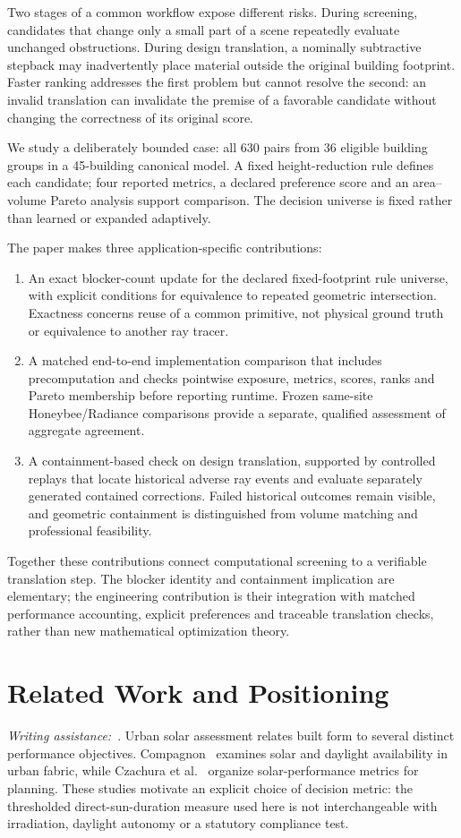 \documentclass{llncs}
\newcommand{\aidraft}{\textit{Writing assistance:}~\cite{openai2026}. }
\begin{document}
Two stages of a common workflow expose different risks. During screening, candidates that change only a small part of a scene repeatedly evaluate unchanged obstructions. During design translation, a nominally subtractive stepback may inadvertently place material outside the original building footprint. Faster ranking addresses the first problem but cannot resolve the second: an invalid translation can invalidate the premise of a favorable candidate without changing the correctness of its original score.

We study a deliberately bounded case: all 630 pairs from 36 eligible building groups in a 45-building canonical model. A fixed height-reduction rule defines each candidate; four reported metrics, a declared preference score and an area--volume Pareto analysis support comparison. The decision universe is fixed rather than learned or expanded adaptively. 

The paper makes three application-specific contributions:
\begin{enumerate}
\item An exact blocker-count update for the declared fixed-footprint rule universe, with explicit conditions for equivalence to repeated geometric intersection. Exactness concerns reuse of a common primitive, not physical ground truth or equivalence to another ray tracer.
\item A matched end-to-end implementation comparison that includes precomputation and checks pointwise exposure, metrics, scores, ranks and Pareto membership before reporting runtime. Frozen same-site Honeybee/Radiance comparisons provide a separate, qualified assessment of aggregate agreement.
\item A containment-based check on design translation, supported by controlled replays that locate historical adverse ray events and evaluate separately generated contained corrections. Failed historical outcomes remain visible, and geometric containment is distinguished from volume matching and professional feasibility.
\end{enumerate}
Together these contributions connect computational screening to a verifiable translation step. The blocker identity and containment implication are elementary; the engineering contribution is their integration with matched performance accounting, explicit preferences and traceable translation checks, rather than new mathematical optimization theory. 

\section{Related Work and Positioning}
\aidraft{}Urban solar assessment relates built form to several distinct performance objectives. Compagnon~\cite{compagnon2004urban} examines solar and daylight availability in urban fabric, while Czachura et al.~\cite{czachura2022metrics} organize solar-performance metrics for planning. These studies motivate an explicit choice of decision metric: the thresholded direct-sun-duration measure used here is not interchangeable with irradiation, daylight autonomy or a statutory compliance test.
\end{document}
